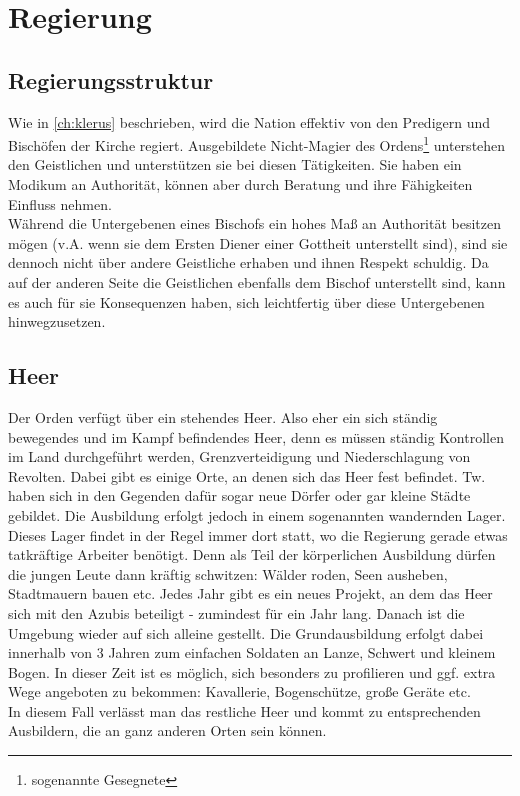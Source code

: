 \chapter{Regierung} \label{ch:regierung}

\section{Regierungsstruktur}
Wie in \ref{ch:klerus} beschrieben, wird die Nation effektiv von den Predigern und Bischöfen der Kirche regiert. 
Ausgebildete Nicht-Magier des Ordens\footnote{sogenannte Gesegnete} unterstehen den Geistlichen und unterstützen sie bei diesen Tätigkeiten. 
Sie haben ein Modikum an Authorität, können aber durch Beratung und ihre Fähigkeiten Einfluss nehmen.\\
Während die Untergebenen eines Bischofs ein hohes Maß an Authorität besitzen mögen (v.A. wenn sie dem Ersten Diener einer Gottheit unterstellt sind), sind sie dennoch nicht über andere Geistliche erhaben und ihnen Respekt schuldig.
Da auf der anderen Seite die Geistlichen ebenfalls dem Bischof unterstellt sind, kann es auch für sie Konsequenzen haben, sich leichtfertig über diese Untergebenen hinwegzusetzen.

\section{Heer}
\begin{outline}
	\1 Der Orden verfügt über ein stehendes Heer. 
		Also eher ein sich ständig bewegendes und im Kampf befindendes Heer, denn es müssen ständig Kontrollen im Land durchgeführt werden, Grenzverteidigung und Niederschlagung von Revolten. 
		Dabei gibt es einige Orte, an denen sich das Heer fest befindet. 
		Tw. haben sich in den Gegenden dafür sogar neue Dörfer oder gar kleine Städte gebildet.
	\1 Die Ausbildung erfolgt jedoch in einem sogenannten wandernden Lager. 
		Dieses Lager findet in der Regel immer dort statt, wo die Regierung gerade etwas tatkräftige Arbeiter benötigt. 
		Denn als Teil der körperlichen Ausbildung dürfen die jungen Leute dann kräftig schwitzen: Wälder roden, Seen ausheben, Stadtmauern bauen etc. 
		Jedes Jahr gibt es ein neues Projekt, an dem das Heer sich mit den Azubis beteiligt - zumindest für ein Jahr lang. 
		Danach ist die Umgebung wieder auf sich alleine gestellt.
	\1 Die Grundausbildung erfolgt dabei innerhalb von 3 Jahren zum einfachen Soldaten an Lanze, Schwert und kleinem Bogen. 
		In dieser Zeit ist es möglich, sich besonders zu profilieren und ggf. extra Wege angeboten zu bekommen: Kavallerie, Bogenschütze, große Geräte etc. \\ 
		In diesem Fall verlässt man das restliche Heer und kommt zu entsprechenden Ausbildern, die an ganz anderen Orten sein können.
\end{outline}